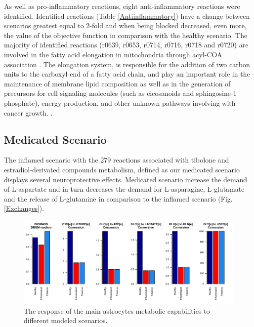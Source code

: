 As well as pro-inflammatory reactions, eight anti-inflammatory reactions were identified. Identified reactions (Table \ref{Antiinflammatory}) have a change between scenarios greatest equal to 2-fold and when being blocked decreased, even more, the value of the objective function in comparison with the healthy scenario. The majority of identified reactions (r0639, r0653, r0714, r0716, r0718 and r0720) are involved in the fatty acid elongation in mitochondria through acyl-COA association \cite{Landriscina1972}. The elongation system, is responsible for the addition of two carbon units to the carboxyl end of a fatty acid chain, and play an important role in the maintenance of membrane lipid composition as well as in the generation of precursors for cell signaling molecules (such as eicosanoids and sphingosine-1 phosphate), energy production, and other unknown pathways involving with cancer growth. \cite{Tamura2009}.

\subsection*{Medicated Scenario}
The inflamed scenario with the 279 reactions associated with tibolone and estradiol-derivated compounds metabolism, defined as our medicated scenario displays several neuroprotective effects. Medicated scenario increase the demand of L-aspartate and in turn decreases the demand for L-asparagine, L-glutamate and the release of L-glutamine in comparison to the inflamed scenario (Fig. \ref{Exchanges}).\\

\begin{figure}[h]
\begin{center}
\includegraphics[width=\textwidth]{neuroprotective/Effects}
\end{center}
\caption{The response of the main astrocytes metabolic capabilities to different modeled scenarios.}
\label{Effects}
\end{figure}

